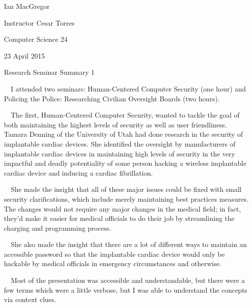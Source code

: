 \documentclass{article}
\title{}
\begin{document}
Ian MacGregor

Instructor Cesar Torres

Computer Science 24

23 April 2015

\begin{center}
Research Seminar Summary 1
\end{center}

\ \ I attended two seminars: Human-Centered Computer Security (one hour) and Policing the Police: Researching Civilian Oversight Boards (two hours). 

\ \ The first, Human-Centered Computer Security, wanted to tackle the goal of both maintaining the highest levels of security as well as user friendliness. Tamara Denning of the University of Utah had done research in the security of implantable cardiac devices. She identified the oversight by manufacturers of implantable cardiac devices in maintaining high levels of security in the very impactful and deadly potentiality of some person hacking a wireless implantable cardiac device and inducing a cardiac fibrillation. 

\ \ She made the insight that all of these major issues could be fixed with small security clarifications, which include merely maintaining best practices measures. The changes would not require any major changes in the medical field; in fact, they'd make it easier for medical officials to do their job by streamlining the charging and programming process. 

\ \ She also made the insight that there are a lot of different ways to maintain an accessible password so that the implantable cardiac device would only be hackable by medical officials in emergency circumstances and otherwise. 

\ \ Most of the presentation was accessible and understandable, but there were a few terms which were a little verbose, but I was able to understand the concepts via context clues. 
\end{document}
